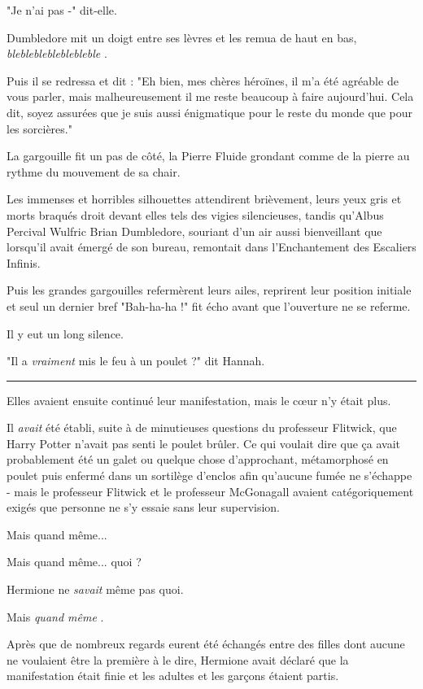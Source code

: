 "Je n'ai pas -" dit-elle.

Dumbledore mit un doigt entre ses lèvres et les remua de haut en bas, \emph{blebleblebleblebleble} .

Puis il se redressa et dit : "Eh bien, mes chères héroïnes, il m'a été agréable de vous parler, mais malheureusement il me reste beaucoup à faire aujourd'hui. Cela dit, soyez assurées que je suis aussi énigmatique pour le reste du monde que pour les sorcières."

La gargouille fit un pas de côté, la Pierre Fluide grondant comme de la pierre au rythme du mouvement de sa chair.

Les immenses et horribles silhouettes attendirent brièvement, leurs yeux gris et morts braqués droit devant elles tels des vigies silencieuses, tandis qu'Albus Percival Wulfric Brian Dumbledore, souriant d'un air aussi bienveillant que lorsqu'il avait émergé de son bureau, remontait dans l'Enchantement des Escaliers Infinis.

Puis les grandes gargouilles refermèrent leurs ailes, reprirent leur position initiale et seul un dernier bref "Bah-ha-ha !" fit écho avant que l'ouverture ne se referme.

Il y eut un long silence.

"Il a \emph{vraiment}  mis le feu à un poulet ?" dit Hannah.
\par\noindent\rule{\textwidth}{0.4pt}
Elles avaient ensuite continué leur manifestation, mais le cœur n'y était plus.

Il \emph{avait}  été établi, suite à de minutieuses questions du professeur Flitwick, que Harry Potter n'avait pas senti le poulet brûler. Ce qui voulait dire que ça avait probablement été un galet ou quelque chose d'approchant, métamorphosé en poulet puis enfermé dans un sortilège d'enclos afin qu'aucune fumée ne s'échappe - mais le professeur Flitwick et le professeur McGonagall avaient catégoriquement exigés que personne ne s'y essaie sans leur supervision.

Mais quand même...

Mais quand même... quoi ?

Hermione ne \emph{savait}  même pas quoi.

Mais \emph{quand même} .

Après que de nombreux regards eurent été échangés entre des filles dont aucune ne voulaient être la première à le dire, Hermione avait déclaré que la manifestation était finie et les adultes et les garçons étaient partis.

